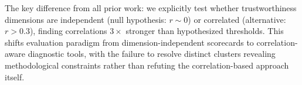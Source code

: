 The key difference from all prior work: we explicitly test whether trustworthiness dimensions are independent (null hypothesis: $r \sim 0$) or correlated (alternative: $r > 0.3$), finding correlations $3\times$ stronger than hypothesized thresholds. This shifts evaluation paradigm from dimension-independent scorecards to correlation-aware diagnostic tools, with the failure to resolve distinct clusters revealing methodological constraints rather than refuting the correlation-based approach itself.
